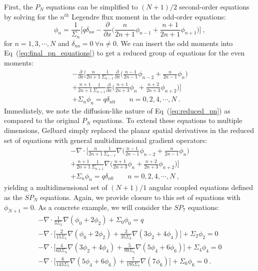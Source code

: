 First, the $P_N$ equations can be simplified to $(N+1)/2$ second-order
equations by solving for the $n^{th}$ Legendre flux moment in the
odd-order equations:
\begin{equation}
  \phi_n = \frac{1}{\Sigma_n}\Bigg[ q \delta_{no} -
    \frac{\partial}{\partial x}\Big(\frac{n}{2n+1}\phi_{n-1} +
    \frac{n+1}{2n+1} \phi_{n+1} \Big) \Bigg]\:, 
  \label{eq:odd_moments}
\end{equation}
for $n = 1,3,\cdots,N$ and $\delta_{no} = 0\ \forall n \neq 0$. We can
insert the odd moments into Eq~(\ref{eq:final_pn_equations}) to get a
reduced group of equations for the even moments:
\begin{multline}
  -\frac{\partial}{\partial x}
  \Bigg[\frac{n}{2n+1}\frac{1}{\Sigma_{n-1}} \frac{\partial}{\partial
      x} \Big(\frac{n-1}{2n-1} \phi_{n-2} + \frac{n}{2n-1}\phi_n \Big)
    \\+ \frac{n+1}{2n+1}\frac{1}{\Sigma_{n+1}} \frac{\partial}{\partial
      x} \Big(\frac{n+1}{2n+3}\phi_n + \frac{n+2}{2n+3}\phi_{n+2}\Big)
    \Bigg] \\+ \Sigma_n \phi_n = q \delta_{n0}\ \ \ \ \ \ \ \ \ n =
  0,2,4,\cdots,N\:.
  \label{eq:reduced_pn}
\end{multline}
Immediately, we note the diffusion-like nature of
Eq~(\ref{eq:reduced_pn}) as compared to the original $P_N$
equations. To extend these equations to multiple dimensions, Gelbard
simply replaced the planar spatial derivatives in the reduced set of
equations with general multidimensional gradient operators:
\begin{multline}
  -\nabla \cdot \Bigg[\frac{n}{2n+1}\frac{1}{\Sigma_{n-1}} \nabla
    \Big(\frac{n-1}{2n-1} \phi_{n-2} + \frac{n}{2n-1}\phi_n \Big) \\+
    \frac{n+1}{2n+1}\frac{1}{\Sigma_{n+1}} \nabla
    \Big(\frac{n+1}{2n+3}\phi_n + \frac{n+2}{2n+3}\phi_{n+2}\Big)
    \Bigg] \\+ \Sigma_n \phi_n = q \delta_{n0}\ \ \ \ \ \ \ \ \ n =
  0,2,4,\cdots,N\:,
  \label{eq:spn_equations}
\end{multline}
yielding a multidimensional set of $(N+1)/1$ angular coupled equations
defined as the $SP_N$ equations. Again, we provide closure to this set
of equations with $\phi_{N+1} = 0$. As a concrete example, we will
consider the $SP_7$ equations:
\begin{subequations}
  \begin{gather}
    -\nabla \cdot \frac{1}{3 \Sigma_1} \nabla ( \phi_0 + 2\phi_2 ) +
    \Sigma_0 \phi_0 = q \\ 
    -\nabla \cdot \Bigg[ \frac{2}{15 \Sigma_1} \nabla ( \phi_0 + 2\phi_2
      ) + \frac{3}{35 \Sigma_3}\nabla( 3\phi_2 + 4\phi_4)\Bigg] +
    \Sigma_2 \phi_2 = 0\\
    -\nabla \cdot \Bigg[ \frac{4}{63 \Sigma_3} \nabla ( 3\phi_2 +
      4\phi_4 ) + \frac{5}{99 \Sigma_5}\nabla( 5\phi_4 +
      6\phi_6)\Bigg] + \Sigma_4 \phi_4 = 0\\
    -\nabla \cdot \Bigg[ \frac{6}{143 \Sigma_5} \nabla ( 5\phi_4 +
      6\phi_6 ) + \frac{7}{195 \Sigma_7}\nabla(7\phi_6)\Bigg] +
    \Sigma_6 \phi_6 = 0 \:.
  \end{gather}
  \label{eq:sp7_equations}
\end{subequations}
